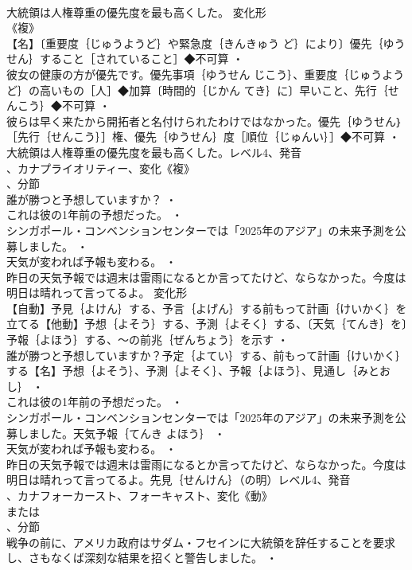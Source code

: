 \documentclass[8pt]{extreport}
\begin{document}
\begin{CJK}{UTF8}{min}
\\	大統領は人権尊重の優先度を最も高くした。	変化形 
\\	《複》
\\	【名】〔重要度｛じゅうようど｝や緊急度｛きんきゅう ど｝により〕優先｛ゆうせん｝すること［されていること］◆不可算 ・
\\	彼女の健康の方が優先です。優先事項｛ゆうせん じこう｝、重要度｛じゅうようど｝の高いもの［人］◆加算〔時間的｛じかん てき｝に〕早いこと、先行｛せんこう｝◆不可算 ・
\\	彼らは早く来たから開拓者と名付けられたわけではなかった。優先｛ゆうせん｝［先行｛せんこう｝］権、優先｛ゆうせん｝度［順位｛じゅんい｝］◆不可算 ・
\\	大統領は人権尊重の優先度を最も高くした。レベル4、発音
\\	、カナプライオリティー、変化《複》
\\	、分節
\\	誰が勝つと予想していますか？ ・
\\	これは彼の1年前の予想だった。 ・
\\	シンガポール・コンベンションセンターでは「2025年のアジア」の未来予測を公募しました。 ・
\\	天気が変われば予報も変わる。 ・
\\	昨日の天気予報では週末は雷雨になるとか言ってたけど、ならなかった。今度は明日は晴れって言ってるよ。	変化形 
\\	【自動】予見｛よけん｝する、予言｛よげん｝する前もって計画｛けいかく｝を立てる【他動】予想｛よそう｝する、予測｛よそく｝する、〔天気｛てんき｝を〕予報｛よほう｝する、～の前兆｛ぜんちょう｝を示す ・
\\	誰が勝つと予想していますか？予定｛よてい｝する、前もって計画｛けいかく｝する【名】予想｛よそう｝、予測｛よそく｝、予報｛よほう｝、見通し｛みとおし｝ ・
\\	これは彼の1年前の予想だった。 ・
\\	シンガポール・コンベンションセンターでは「2025年のアジア」の未来予測を公募しました。天気予報｛てんき よほう｝ ・
\\	天気が変われば予報も変わる。 ・
\\	昨日の天気予報では週末は雷雨になるとか言ってたけど、ならなかった。今度は明日は晴れって言ってるよ。先見｛せんけん｝（の明）レベル4、発音
\\	、カナフォーカースト、フォーキャスト、変化《動》
\\	または
\\	、分節
\\	戦争の前に、アメリカ政府はサダム・フセインに大統領を辞任することを要求し、さもなくば深刻な結果を招くと警告しました。 ・

\end{CJK}
\end{document}
